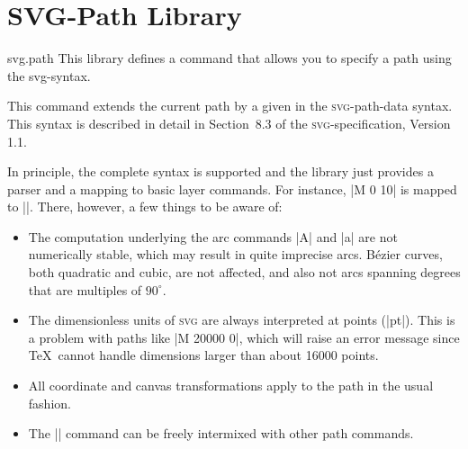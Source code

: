 %
%
%


\section{SVG-Path Library}
\label{section-library-svg-path}

\begin{pgflibrary}{svg.path}
  This library defines a command that allows you to specify a path
  using the svg-syntax.
\end{pgflibrary}

\begin{command}{\pgfpathsvg{}}
  This command extends the current path by a  given in the
  \textsc{svg}-path-data syntax. This syntax is described in detail in
  Section~8.3 of the \textsc{svg}-specification, Version 1.1. 

  In principle, the complete syntax is supported and the library just
  provides a parser and a mapping to basic layer commands. For
  instance, |M 0 10| is mapped to
  |\pgfpathmoveto{\pgfpoint{0pt}{10pt}}|. There, however, a few things
  to be aware of:
  \begin{itemize}
  \item The computation underlying the arc commands |A| and |a|
    are not numerically stable, which may result in quite imprecise
    arcs. B\'ezier curves, both quadratic and cubic, are not affected,
    and also not arcs spanning degrees that are multiples of
    $90^\circ$.
  \item The dimensionless units of \textsc{svg} are always interpreted
    at points (|pt|). This is a problem with paths like |M 20000 0|,
    which will raise an error message since \TeX\ cannot handle
    dimensions larger than about 16000 points.
  \item
    All coordinate and canvas transformations apply to the path in the
    usual fashion.
  \item
    The |\pgfpathsvg| command can be freely intermixed with other path
    commands. 
  \end{itemize}
\begin{codeexample}[]
\begin{pgfpicture}
\end{pgfpicture}
\end{codeexample}
\end{command}


